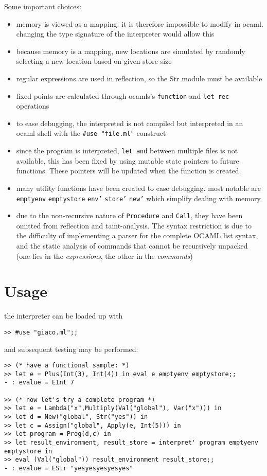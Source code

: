 \documentclass[11pt]{article}
\begin{document}
Some important choices:
\begin{itemize}
\item memory is viewed as a mapping. it is therefore impossible to modify in ocaml. changing the type signature of the interpreter would allow this
\item because memory is a mapping, new locations are simulated by randomly selecting a new location based on given store size
\item regular expressions are used in reflection, so the Str module must be available
\item fixed points are calculated through ocamls's \texttt{function} and \texttt{let rec} operations
\item to ease debugging, the interpreted is not compiled but interpreted in an ocaml shell with the \texttt{\#use "file.ml"} construct
\item since the program is interpreted, \texttt{let and} between multiple files is not available, this has been fixed by using mutable state pointers to future functions. These pointers will be updated
when the function is created.
\item many utility functions have been created to ease debugging. most notable are \texttt{emptyenv} \texttt{emptystore} \texttt{env'} \texttt{store'} \texttt{new'} which simplify dealing with memory
\item due to the non-recursive nature of \texttt{Procedure} and \texttt{Call}, they have been omitted from reflection and taint-analysis. The syntax restriction is due to the difficulty of implementing a parser 
for the complete OCAML list syntax, and the static analysis of commands that cannot be recursively unpacked (one lies in the \emph{expressions}, the other in the \emph{commands})
\end{itemize}
\section{Usage}
\label{sec:orgdbdcb5f}
the interpreter can be loaded up with
\begin{verbatim}
>> #use "giaco.ml";;
\end{verbatim}

and subsequent testing may be performed:
\begin{verbatim}
>> (* have a functional sample: *)
>> let e = Plus(Int(3), Int(4)) in eval e emptyenv emptystore;;
- : evalue = EInt 7

>> (* now let's try a complete program *)
>> let e = Lambda("x",Multiply(Val("global"), Var("x"))) in
>> let d = New("global", Str("yes")) in
>> let c = Assign("global", Apply(e, Int(5))) in
>> let program = Prog(d,c) in
>> let result_environment, result_store = interpret' program emptyenv emptystore in
>> eval (Val("global")) result_environment result_store;;
- : evalue = EStr "yesyesyesyesyes"
\end{verbatim}
\end{document}
